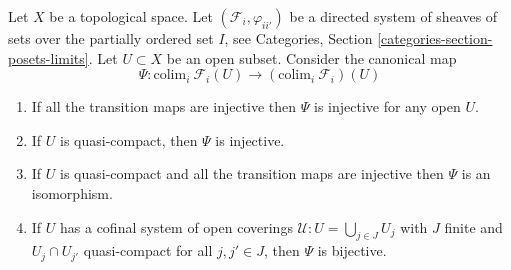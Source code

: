 \begin{lemma}
\label{lemma-directed-colimits-sections}
Let $X$ be a topological space.
Let $(\mathcal{F}_i, \varphi_{ii'})$ be a directed system of sheaves of sets
over the partially ordered set $I$, see
Categories, Section \ref{categories-section-posets-limits}.
Let $U \subset X$ be an open subset.
Consider the canonical map
$$
\Psi :
\text{colim}_i\ \mathcal{F}_i(U)
\longrightarrow
\left(\text{colim}_i\ \mathcal{F}_i\right)(U)
$$
\begin{enumerate}
\item If all the transition maps are injective then
$\Psi$ is injective for any open $U$.
\item If $U$ is quasi-compact, then $\Psi$ is injective.
\item If $U$ is quasi-compact and all the transition maps are injective
then $\Psi$ is an isomorphism.
\item If $U$ has a cofinal system of open coverings
$\mathcal{U} : U = \bigcup_{j\in J} U_j$ with
$J$ finite and $U_j \cap U_{j'}$ quasi-compact
for all $j, j' \in J$, then $\Psi$ is bijective.
\end{enumerate}
\end{lemma}

